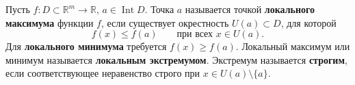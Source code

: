 \label{definition:03}

\begin{definition}
Пусть $f:D\subset\mathbb R^m\to\mathbb R$, $a\in\operatorname{Int}D$.
Точка $a$ называется точкой \textbf{локального максимума} функции $f$, если существует окрестность $U(a)\subset D$, для которой
\[
  f(x)\le f(a)\qquad\text{при всех }x\in U(a).
\]
Для \textbf{локального минимума} требуется $f(x)\ge f(a)$.
Локальный максимум или минимум называется \textbf{локальным экстремумом}.
Экстремум называется \textbf{строгим}, если соответствующее неравенство строго при $x\in U(a)\setminus\{a\}$.
\end{definition}
